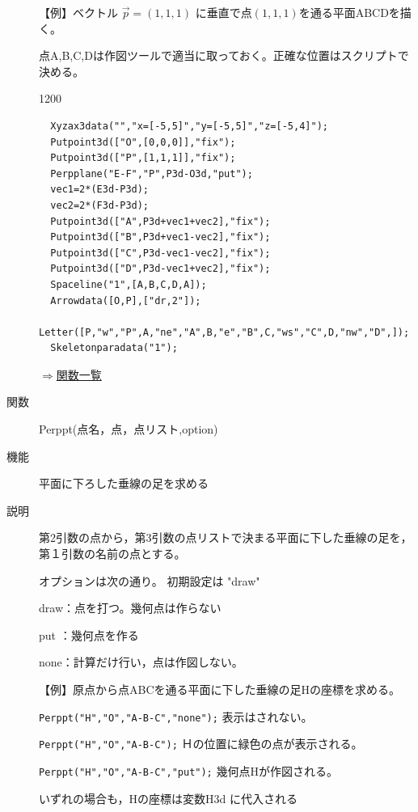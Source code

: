 \documentclass[papersize,a4paper,12pt,uplatex]{jsarticle}
\begin{document}
\begin{description}
\vspace{\baselineskip}
【例】ベクトル $\vec{p}=(1,1,1)$ に垂直で点$(1,1,1)$を通る平面ABCDを描く。

  点A,B,C,Dは作図ツールで適当に取っておく。正確な位置はスクリプトで決める。

\begin{layer}{120}{0}
\end{layer}

\begin{verbatim}
  Xyzax3data("","x=[-5,5]","y=[-5,5]","z=[-5,4]");
  Putpoint3d(["O",[0,0,0]],"fix");
  Putpoint3d(["P",[1,1,1]],"fix");
  Perpplane("E-F","P",P3d-O3d,"put");
  vec1=2*(E3d-P3d);
  vec2=2*(F3d-P3d);
  Putpoint3d(["A",P3d+vec1+vec2],"fix");
  Putpoint3d(["B",P3d+vec1-vec2],"fix");
  Putpoint3d(["C",P3d-vec1-vec2],"fix");
  Putpoint3d(["D",P3d-vec1+vec2],"fix");
  Spaceline("1",[A,B,C,D,A]);
  Arrowdata([O,P],["dr,2"]);
  Letter([P,"w","P",A,"ne","A",B,"e","B",C,"ws","C",D,"nw","D",]);
  Skeletonparadata("1");
\end{verbatim}


\begin{flushright} \hyperlink{functionlist}{$\Rightarrow$関数一覧}\end{flushright}
\vspace{\baselineskip}

\hypertarget{perppt}{}
\item[関数]  Perppt(点名，点，点リスト,option)
\item[機能]  平面に下ろした垂線の足を求める
\item[説明]  第2引数の点から，第3引数の点リストで決まる平面に下した垂線の足を，第１引数の名前の点とする。

オプションは次の通り。 初期設定は "draw"

draw：点を打つ。幾何点は作らない

put ：幾何点を作る

none：計算だけ行い，点は作図しない。

\vspace{\baselineskip}
【例】原点から点ABCを通る平面に下した垂線の足Hの座標を求める。

 \verb|Perppt("H","O","A-B-C","none");|   表示はされない。
 
 \verb|Perppt("H","O","A-B-C");|         Ｈの位置に緑色の点が表示される。
 
 \verb|Perppt("H","O","A-B-C","put");|     幾何点Hが作図される。
 
  いずれの場合も，Hの座標は変数H3d に代入される
  

\end{description}
\end{document}
